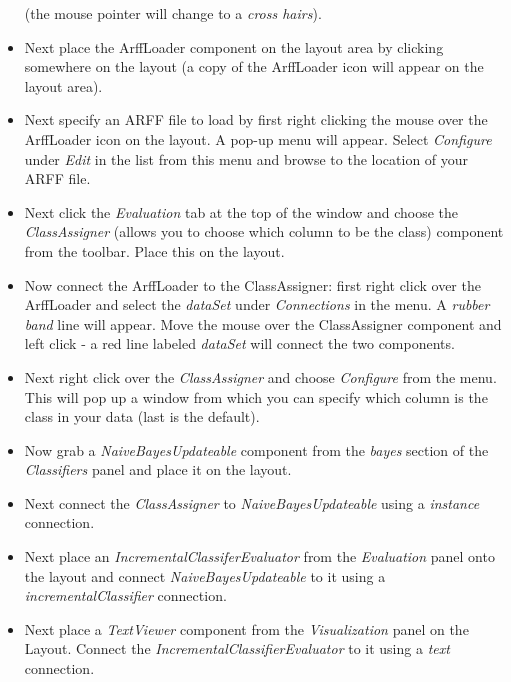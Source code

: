 \begin{itemize}
(the mouse pointer will change to a \textit{cross hairs}).

	\item Next place the ArffLoader component on the layout area by clicking
	somewhere on the layout (a copy of the ArffLoader icon will appear on
	the layout area).

	\item Next specify an ARFF file to load by first right clicking the mouse
	over the ArffLoader icon on the layout. A pop-up menu will
	appear. Select \textit{Configure} under \textit{Edit} in the list from this menu and
	browse to the location of your ARFF file.

	\item Next click the \textit{Evaluation} tab at the top of the window and choose the
	\textit{ClassAssigner} (allows you to choose which column to be the class)
	component from the toolbar. Place this on the layout.

	\item Now connect the ArffLoader to the ClassAssigner: first right click
	over the ArffLoader and select the \textit{dataSet} under \textit{Connections} in
	the menu. A \textit{rubber band} line will appear. Move the mouse over the
	ClassAssigner component and left click - a red line labeled \textit{dataSet}
	will connect the two components.

	\item Next right click over the \textit{ClassAssigner} and choose \textit{Configure} from
	the menu. This will pop up a window from which you can specify which
	column is the class in your data (last is the default).

        \item Now grab a \textit{NaiveBayesUpdateable} component from the \textit{bayes}
        section of the \textit{Classifiers} panel and place it on the layout.

        \item Next connect the \textit{ClassAssigner} to \textit{NaiveBayesUpdateable}
        using a \textit{instance} connection.

        \item Next place an \textit{IncrementalClassiferEvaluator} from the \textit{Evaluation}
        panel onto the layout and connect \textit{NaiveBayesUpdateable} to it using a
        \textit{incrementalClassifier} connection.

        \item Next place a \textit{TextViewer} component from the \textit{Visualization}
        panel on the Layout. Connect the \textit{IncrementalClassifierEvaluator} to
        it using a \textit{text} connection.


\end{itemize}
